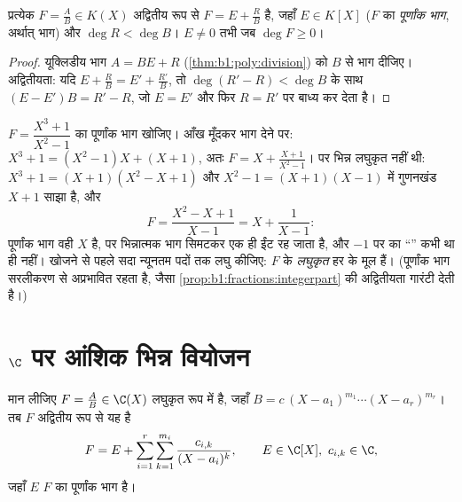 \begin{proposition}[पूर्णांक भाग]\label{prop:b1:fractions:integerpart}
प्रत्येक $F = \frac AB \in K(X)$ अद्वितीय रूप से $F = E + \frac RB$ है, जहाँ
$E \in K[X]$ ($F$ का \emph{पूर्णांक भाग}, अर्थात्  भाग) और $\deg R <
\deg B$। $E \neq 0$ तभी जब $\deg F \geq 0$।
\end{proposition}

\begin{proof}
यूक्लिडीय भाग $A = BE + R$ (\cref{thm:b1:poly:division}) को $B$ से भाग
दीजिए। अद्वितीयता: यदि $E + \frac RB = E' + \frac{R'}{B}$, तो $\deg(R' - R)
< \deg B$ के साथ $(E - E')B = R' - R$, जो $E = E'$ और फिर $R = R'$ पर बाध्य
कर देता है।
\end{proof}

\begin{example}[पहले लघु कीजिए, फिर भाग दीजिए]\label{ex:b1:fractions:integerpart}
$F = \dfrac{X^3 + 1}{X^2 - 1}$ का पूर्णांक भाग खोजिए। आँख मूँदकर भाग देने
पर: $X^3 + 1 = (X^2 - 1)X + (X + 1)$, अतः $F = X + \frac{X + 1}{X^2 - 1}$।
पर भिन्न लघुकृत नहीं थी: $X^3 + 1 = (X + 1)(X^2 - X + 1)$ और $X^2 - 1 =
(X+1)(X-1)$ में गुणनखंड $X + 1$ साझा है, और
\[
F = \frac{X^2 - X + 1}{X - 1} = X + \frac{1}{X - 1} :
\]
पूर्णांक भाग वही $X$ है, पर भिन्नात्मक भाग सिमटकर एक ही ईंट रह जाता है, और
$-1$ पर का ``'' कभी  था ही नहीं।  खोजने से पहले सदा न्यूनतम
पदों तक लघु कीजिए: $F$ के  \emph{लघुकृत} हर के मूल हैं। (पूर्णांक भाग
सरलीकरण से अप्रभावित रहता है, जैसा \cref{prop:b1:fractions:integerpart} की
अद्वितीयता गारंटी देती है।)
\end{example}

\section{$\C$ पर आंशिक भिन्न वियोजन}

\begin{theorem}[$\C$ पर वियोजन]\label{thm:b1:fractions:complex}
मान लीजिए $F = \frac AB \in \C(X)$ लघुकृत रूप में है, जहाँ $B = c\,(X -
a_1)^{m_1} \cdots (X - a_r)^{m_r}$। तब $F$ अद्वितीय रूप से यह है
\[
F = E + \sum_{i=1}^{r} \sum_{k=1}^{m_i}
\frac{c_{i,k}}{(X - a_i)^k},
\qquad E \in \C[X],\ c_{i,k} \in \C ,
\]
जहाँ $E$ $F$ का पूर्णांक भाग है।
\end{theorem}


